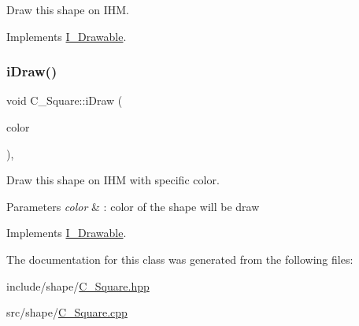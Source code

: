 Draw this shape on I\+HM. 



Implements \hyperlink{classI__Drawable_ae24c65000977a805f52ce032321cd86f}{I\+\_\+\+Drawable}.

\mbox{\label{classC__Square_a47a80c25bbeda17f17a8230127b4a5ed}} 
\subsubsection{\texorpdfstring{i\+Draw()}{iDraw()}\hspace{0.1cm}{\footnotesize\ttfamily [2/2]}}
{\footnotesize\ttfamily void C\+\_\+\+Square\+::i\+Draw (\begin{DoxyParamCaption}\item[{M\+L\+V\+\_\+\+Color}]{color }\end{DoxyParamCaption})\hspace{0.3cm}{\ttfamily [override]}, {\ttfamily [virtual]}}



Draw this shape on I\+HM with specific color. 


\begin{DoxyParams}{Parameters}
{\em color} & \+: color of the shape will be draw \\
\hline
\end{DoxyParams}


Implements \hyperlink{classI__Drawable_a25f6474325614c451a91f019e5fe8010}{I\+\_\+\+Drawable}.



The documentation for this class was generated from the following files\+:\begin{DoxyCompactItemize}
\item 
include/shape/\hyperlink{C__Square_8hpp}{C\+\_\+\+Square.\+hpp}\item 
src/shape/\hyperlink{C__Square_8cpp}{C\+\_\+\+Square.\+cpp}\end{DoxyCompactItemize}
